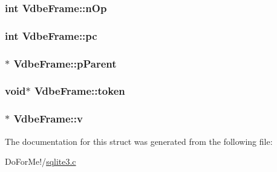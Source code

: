 \hypertarget{struct_vdbe_frame_acffd5d53fbb5cb55e257c34a547c1762}{
\subsubsection[{n\-Op}]{\setlength{\rightskip}{0pt plus 5cm}int Vdbe\-Frame\-::n\-Op}}\label{struct_vdbe_frame_acffd5d53fbb5cb55e257c34a547c1762}
\hypertarget{struct_vdbe_frame_aed0e6d8cb1908580a3c2aca04516b46c}{
\subsubsection[{pc}]{\setlength{\rightskip}{0pt plus 5cm}int Vdbe\-Frame\-::pc}}\label{struct_vdbe_frame_aed0e6d8cb1908580a3c2aca04516b46c}
\hypertarget{struct_vdbe_frame_afb11d8aa920f34720333f52737375d59}{
\subsubsection[{p\-Parent}]{$\ast$ Vdbe\-Frame\-::p\-Parent}}\label{struct_vdbe_frame_afb11d8aa920f34720333f52737375d59}
\hypertarget{struct_vdbe_frame_a11de10011ea2164995c6b616bba8a576}{
\subsubsection[{token}]{\setlength{\rightskip}{0pt plus 5cm}void$\ast$ Vdbe\-Frame\-::token}}\label{struct_vdbe_frame_a11de10011ea2164995c6b616bba8a576}
\hypertarget{struct_vdbe_frame_a2f6258356959c94398d1d006a740c4ce}{
\subsubsection[{v}]{$\ast$ Vdbe\-Frame\-::v}}\label{struct_vdbe_frame_a2f6258356959c94398d1d006a740c4ce}


The documentation for this struct was generated from the following file\-:\begin{DoxyCompactItemize}
\item 
Do\-For\-Me!/\hyperlink{sqlite3_8c}{sqlite3.\-c}\end{DoxyCompactItemize}
